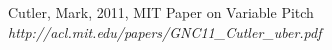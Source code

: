 \section * {}
\begin{thebibliography}{5}

         Cutler, Mark, 2011, MIT Paper on Variable Pitch    \\ %
\textit{http://acl.mit.edu/papers/GNC11{\_}Cutler{\_}uber.pdf}\\
       


\end{thebibliography}